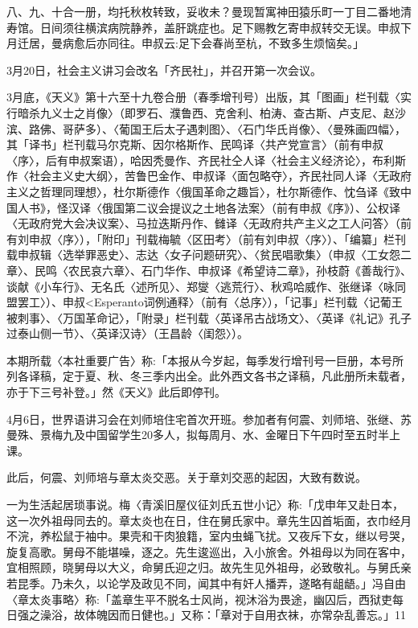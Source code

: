 \noindent 八、九、十合一册，均托秋枚转致，妥收未？曼现暂寓神田猿乐町一丁目二番地清寿馆。日间须往横滨病院静养，盖肝跳症也。足下赐教乞寄申叔转交无误。申叔下月迁居，曼病愈后亦同往。申叔云:足下会春尚至杭，不致多生烦恼矣。」

3月20日，社会主义讲习会改名「齐民社」，并召开第一次会议。

3月底，《天义》第十六至十九卷合册（春季增刊号）出版，其「图画」栏刊载〈实行暗杀九义士之肖像〉（即罗石、濮鲁西、克舍利、柏涛、查古斯、卢支尼、赵沙滨、路佛、哥萨多）、〈葡国王后太子遇刺图〉、〈石门华氏肖像〉、〈曼殊画四幅〉，其「译书」栏刊载马尔克斯、因尔格斯作、民鸣译〈共产党宣言〉（前有申叔〈序〉，后有申叔案语），哈因秃曼作、齐民社仝人译〈社会主义经济论〉，布利斯作〈社会主义史大纲〉，苦鲁巴金作、申叔译〈面包略夺〉，齐民社同人译〈无政府主义之哲理同理想〉，杜尔斯德作〈俄国革命之趣旨〉，杜尔斯德作、忱刍译《致中国人书》，怪汉译〈俄国第二议会提议之土地各法案〉（前有申叔《序》）、公权译〈无政府党大会决议案〉、马拉迭斯丹作、雠译〈无政府共产主义之工人问答〉（前有刘申叔〈序〉），「附印」刊载梅毓〈区田考〉（前有刘申叔〈序〉）、「编纂」栏刊载申叔辑〈选举罪恶史〉、志达〈女子问题研究〉、〈贫民唱歌集〉（申叔〈工女怨二章〉、民鸣〈农民哀六章〉、石门华作、申叔译《希望诗二章》，孙枝蔚《善哉行》、谈献《小车行》、无名氏〈述所见〉、郑燮〈逃荒行〉、秋鸡哈威作、张继译〈咏同盟罢工〉）、申叔<Esperanto词例通释〉（前有〈总序〉），「记事」栏刊载〈记葡王被刺事〉、〈万国革命记〉，「附录」栏刊载〈英译吊古战场文〉、〈英译《礼记》孔子过泰山侧一节〉、〈英译汉诗〉（王昌龄〈闺怨〉）。

本期所载〈本社重要广告〉称:「本报从今岁起，每季发行增刊号一巨册，本号所列各译稿，定于夏、秋、冬三季内出全。此外西文各书之译稿，凡此册所未载者，亦于下三号补登。」然《天义》此后即停刊。

4月6日，世界语讲习会在刘师培住宅首次开班。参加者有何震、刘师培、张继、苏曼殊、景梅九及中国留学生20多人，拟每周月、水、金曜日下午四时至五时半上课。


此后，何震、刘师培与章太炎交恶。关于章刘交恶的起因，大致有数说。

一为生活起居琐事说。梅〈青溪旧屋仪征刘氏五世小记〉称:「戊申年又赴日本，这一次外祖母同去的。章太炎也在日，住在舅氏家中。章先生囚首垢面，衣巾经月不浣，养松鼠于袖中。果壳和干肉狼籍，室内虫蝇飞扰。又夜斥下女，继以号哭，旋复高歌。舅母不能堪噪，逐之。先生逡巡出，入小旅舍。外祖母以为同在客中，宜相照顾，晓舅母以大义，命舅氏迎之归。故先生见外祖母，必致敬礼。与舅氏亲若昆季。乃未久，以论学及政见不同，闻其中有奸人播弄，遂略有龃龉。」冯自由〈章太炎事略〉称:「盖章生平不脱名士风尚，视沐浴为畏途，幽囚后，西狱吏每日强之澡浴，故体魄因而日健也。」又称：「章对于自用衣袜，亦常杂乱善忘。」11

